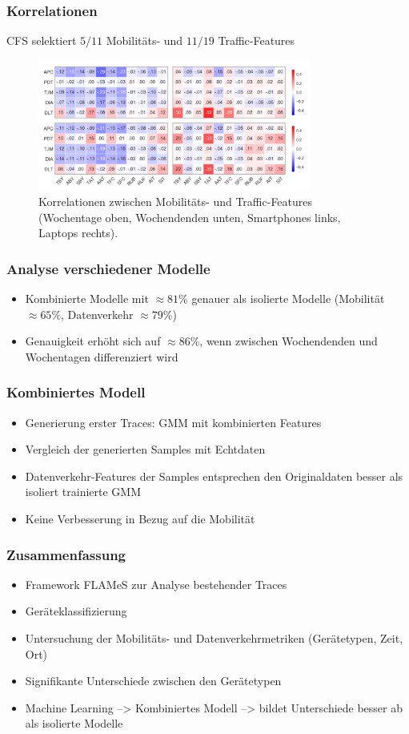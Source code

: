 \documentclass{beamer}
\begin{document}
\begin{frame}
  \frametitle{Korrelationen}
  CFS selektiert $5 / 11$ Mobilitäts- und $11 / 19$ Traffic-Features
  \begin{figure}
    \centering
    \includegraphics[width=0.8\textwidth]{images/correlations.png}\newline
    \caption*{Korrelationen zwischen Mobilitäts- und Traffic-Features (Wochentage oben, Wochendenden unten,
    Smartphones links, Laptops rechts).}
  \end{figure}
\end{frame}

\begin{frame}
  \frametitle{Analyse verschiedener Modelle}
  \begin{itemize}
    \item Kombinierte Modelle mit $\approx 81\%$ genauer als isolierte Modelle (Mobilität $\approx 65 \%$, Datenverkehr $\approx 79 \%$)
    \item Genauigkeit erhöht sich auf $\approx 86\%$, wenn zwischen Wochendenden und Wochentagen differenziert wird    
  \end{itemize}
\end{frame}

\begin{frame}
  \frametitle{Kombiniertes Modell}
  \begin{itemize}
    \item Generierung erster Traces: GMM mit kombinierten Features
    \item Vergleich der generierten Samples mit Echtdaten
    \item Datenverkehr-Features der Samples entsprechen den Originaldaten besser als isoliert trainierte GMM
    \item Keine Verbesserung in Bezug auf die Mobilität
  \end{itemize}
\end{frame}

\begin{frame}
  \frametitle{Zusammenfassung}
  \begin{itemize}
    \item Framework FLAMeS zur Analyse bestehender Traces
    \item Geräteklassifizierung
    \item Untersuchung der Mobilitäts- und Datenverkehrmetriken (Gerätetypen, Zeit, Ort)
    \item Signifikante Unterschiede zwischen den Gerätetypen
    \item Machine Learning --> Kombiniertes Modell --> bildet Unterschiede besser ab als isolierte Modelle
  \end{itemize}  
\end{frame}
\end{document}
